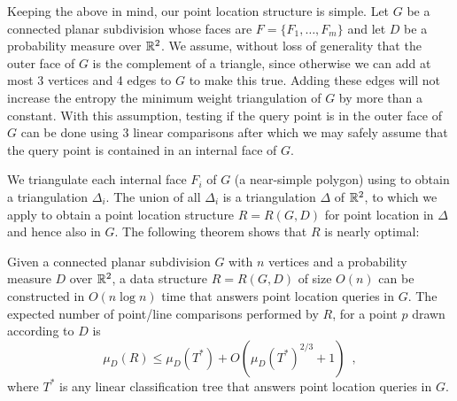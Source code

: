 \documentclass[lotsofwhite]{patmorin}
\begin{document}
Keeping the above in mind, our point location structure is simple.
Let $G$ be a connected planar subdivision whose faces are
$F=\{F_1,\ldots,F_m\}$ and let $D$ be a probability measure over
$\mathbb{R}^2$.  We assume, without loss of generality that the outer face of
$G$ is the complement of a triangle, since otherwise we can add at
most 3 vertices and 4 edges to $G$ to make this true.  Adding these
edges will not increase the entropy the minimum weight triangulation
of $G$ by more than a constant.  With this assumption, testing if the
query point is in the outer face of $G$ can be done using 3 linear
comparisons after which we may safely assume that the query point is
contained in an internal face of $G$.

We triangulate each internal face $F_i$ of $G$ (a near-simple polygon)
using  to obtain a triangulation
$\Delta_i$. The union of all $\Delta_i$
is a triangulation $\Delta$ of $\mathbb{R}^2$, to which we apply
 to obtain a point location structure $R=R(G,D)$ for
point location in $\Delta$ and hence also in $G$.  The following
theorem shows that $R$ is nearly optimal:

\begin{thm}
Given a connected planar subdivision $G$ with $n$ vertices and a probability
measure $D$ over $\mathbb{R}^2$, a data structure $R=R(G,D)$ of size $O(n)$ can be
constructed in $O(n\log n)$ time that answers point location queries in $G$.
The expected number of point/line comparisons performed by $R$, 
for a point $p$ drawn according to $D$ is 
\[
  \mu_D(R) \le \mu_D(T^*) + O(\mu_D(T^*)^{2/3}+1) \enspace , 
\] 
where $T^*$ is any linear classification tree that answers point
location queries in $G$.
\end{thm}
\end{document}
